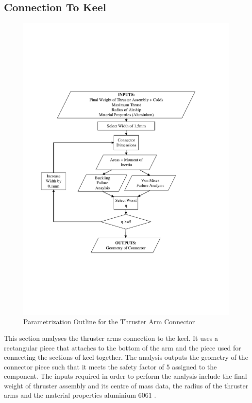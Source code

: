 \documentclass[../main.tex]{subfiles}
\begin{document}
\subsection{Connection To Keel} \label{connector}
\begin{figure}[H]
	\centering
	\includegraphics[width=.9\linewidth]{img/paramaterization/connector.pdf}
	\caption{Parametrization Outline for the Thruster Arm Connector}
	\label{fig:connectorParametrization}
\end{figure}

This section analyses the thruster arms connection to the keel. It uses a rectangular piece that attaches to the bottom of the arm and the piece used for connecting the sections of keel together. The analysis outputs the geometry of the connector piece such that it meets the safety factor of 5 assigned to the component. The inputs required in order to perform the analysis include the final weight of thruster assembly and its centre of mass data, the radius of the thruster arms and the material properties aluminium 6061 \cite{AlProperties}. \\
\end{document}
